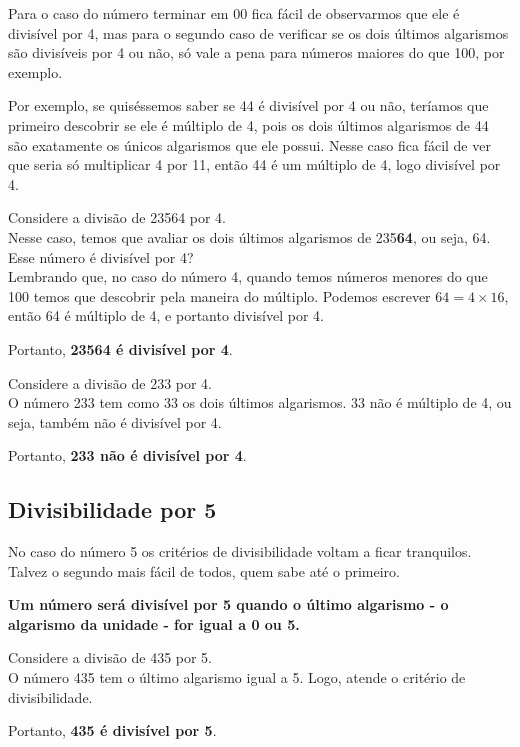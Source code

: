Para o caso do número terminar em 00 fica fácil de observarmos que ele é divisível por 4, mas para o segundo caso de verificar se os dois últimos algarismos são divisíveis por 4 ou não, só vale a pena para números maiores do que 100, por exemplo.

Por exemplo, se quiséssemos saber se 44 é divisível por 4 ou não, teríamos que primeiro descobrir se ele é múltiplo de 4, pois os dois últimos algarismos de 44 são exatamente os únicos algarismos que ele possui. Nesse caso fica fácil de ver que seria só multiplicar 4 por 11, então 44 é um múltiplo de 4, logo divisível por 4.

\begin{exemplo}
    Considere a divisão de 23564 por 4.\\

    Nesse caso, temos que avaliar os dois últimos algarismos de 235\textbf{64}, ou seja, 64. Esse número é divisível por 4? \\

    Lembrando que, no caso do número 4, quando temos números menores do que 100 temos que descobrir pela maneira do múltiplo. Podemos escrever \(64=4\times16\), então 64 é múltiplo de 4, e portanto divisível por 4.

    Portanto, \textbf{23564 é divisível por 4}.\\
\end{exemplo}

\begin{exemplo}
    Considere a divisão de 233 por 4.\\

    O número 233 tem como 33 os dois últimos algarismos. 33 não é múltiplo de 4, ou seja, também não é divisível por 4.

    Portanto, \textbf{233 não é divisível por 4}.
\end{exemplo}

\subsection{Divisibilidade por 5}
No caso do número 5 os critérios de divisibilidade voltam a ficar tranquilos. Talvez o segundo mais fácil de todos, quem sabe até o primeiro.

\textbf{Um número será divisível por 5 quando o último algarismo - o algarismo da unidade - for igual a 0 ou 5.}

\begin{exemplo}
    Considere a divisão de 435 por 5.\\

    O número 435 tem o último algarismo igual a 5. Logo, atende o critério de divisibilidade.

    Portanto, \textbf{435 é divisível por 5}.
\end{exemplo}

